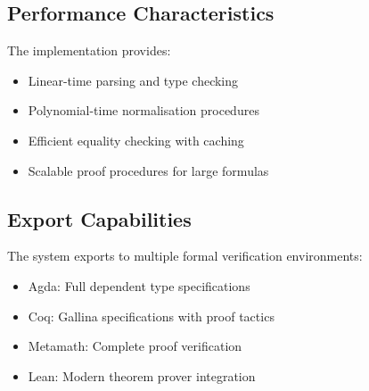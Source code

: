 \subsection{Performance Characteristics}

The implementation provides:
\begin{itemize}
\item Linear-time parsing and type checking
\item Polynomial-time normalisation procedures
\item Efficient equality checking with caching
\item Scalable proof procedures for large formulas
\end{itemize}

\subsection{Export Capabilities}

The system exports to multiple formal verification environments:
\begin{itemize}
\item Agda: Full dependent type specifications
\item Coq: Gallina specifications with proof tactics
\item Metamath: Complete proof verification
\item Lean: Modern theorem prover integration
\end{itemize}



